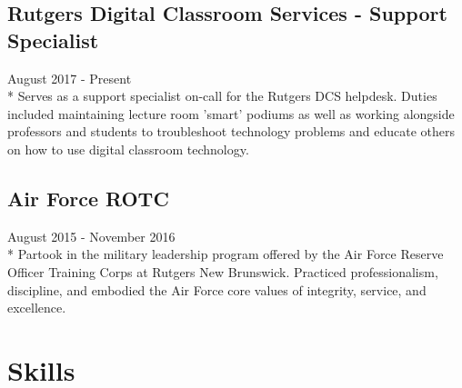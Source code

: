\documentclass{article}
\begin{document}
\subsection{Rutgers Digital Classroom Services - Support Specialist}
August 2017 - Present\\*
Serves as a support specialist on-call for the Rutgers DCS helpdesk. Duties included maintaining lecture room 'smart' podiums as well as working alongside professors and students to troubleshoot technology problems and educate others on how to use digital classroom technology.

\subsection{Air Force ROTC}
August 2015 - November 2016\\*
Partook in the military leadership program offered by the Air Force Reserve Officer Training Corps at Rutgers New Brunswick. Practiced professionalism, discipline, and embodied the Air Force core values of integrity, service, and excellence.


\iffalse
\subsection{Relevant Coursework}
\begin{itemize}
\item AP Computer Science
\item Information Technology and Informatics
\item Technical Writing Essential
\item Computer Aided Drafting
\item Web Design
\item Networking and Internet Technologies
\item Management in Technological Organizaitons
\item Economics of Information Technology (In Progress)
\item Information Security (In Progress)
\end{itemize}
\fi

\section{Skills}

\iffalse
\subsection{Soft Skills}
Technical Writing/Documentation Writing, Router Configuration, Server Administration, Raspberry Pi, Arduino
\fi
\end{document}
